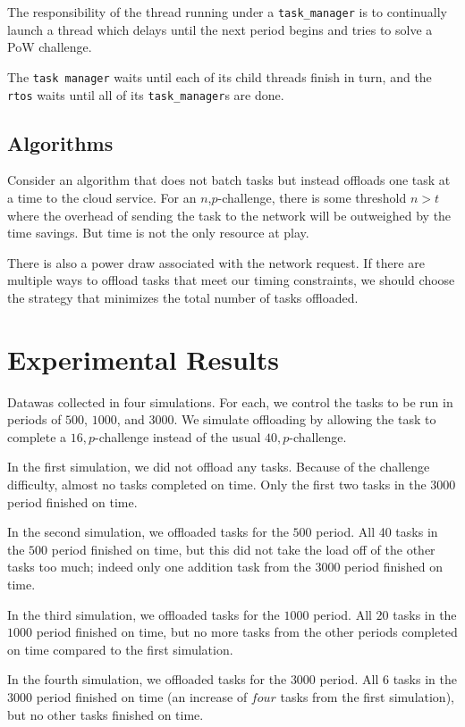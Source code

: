 \documentclass[twoside,twocolumn]{article}
\begin{document}
The responsibility of the thread running under a \texttt{task\_manager} is to continually launch a thread which delays until the next period begins and tries to solve a PoW challenge.

The \texttt{task manager} waits until each of its child threads finish in turn, and the \texttt{rtos} waits until all of its \texttt{task\_manager}s are done.

\subsection{Algorithms}

Consider an algorithm that does not batch tasks but instead offloads one task at a time to the cloud service.
For an $n$,$p$-challenge, there is some threshold $n>t$ where the overhead of sending the task to the network will be outweighed by the time savings.
But time is not the only resource at play.

There is also a power draw associated with the network request.
If there are multiple ways to offload tasks that meet our timing constraints, we should choose the strategy that minimizes the total number of tasks offloaded.

\section{Experimental Results}

Data\footnotemark was collected in four simulations.
For each, we control the tasks to be run in periods of $500$, $1000$, and $3000$.
We simulate offloading by allowing the task to complete a $16,p$-challenge instead of the usual $40,p$-challenge.

In the first simulation, we did not offload any tasks.
Because of the challenge difficulty, almost no tasks completed on time.
Only the first two tasks in the $3000$ period finished on time.

In the second simulation, we offloaded tasks for the $500$ period.
All 40 tasks in the $500$ period finished on time, but this did not take the load off of the other tasks too much; indeed only one addition task from the $3000$ period finished on time.

In the third simulation, we offloaded tasks for the $1000$ period.
All $20$ tasks in the $1000$ period finished on time, but no more tasks from the other periods completed on time compared to the first simulation.

In the fourth simulation, we offloaded tasks for the $3000$ period.
All $6$ tasks in the $3000$ period finished on time (an increase of $four$ tasks from the first simulation), but no other tasks finished on time.
\end{document}
